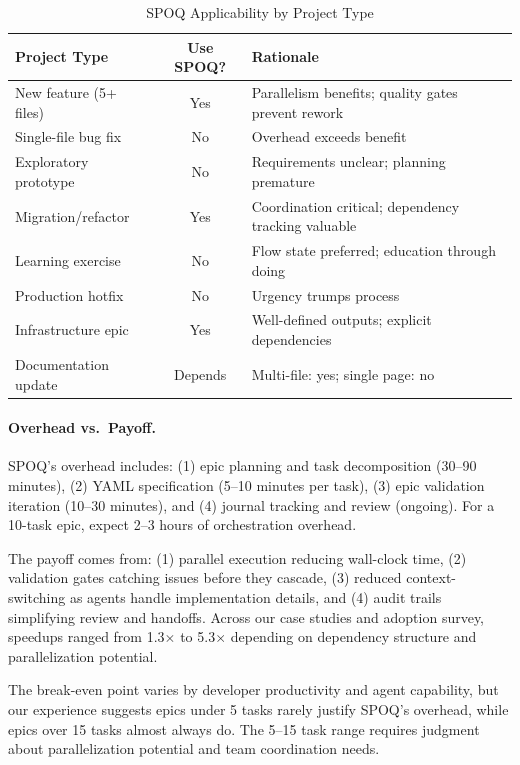 \begin{table}[htbp]
\centering
\caption{SPOQ Applicability by Project Type}
\label{tab:when-to-use}
\footnotesize
\begin{tabular}{lcp{6.5cm}}
\toprule
\textbf{Project Type} & \textbf{Use SPOQ?} & \textbf{Rationale} \\
\midrule
New feature (5+ files) & Yes & Parallelism benefits; quality gates prevent rework \\
Single-file bug fix & No & Overhead exceeds benefit \\
Exploratory prototype & No & Requirements unclear; planning premature \\
Migration/refactor & Yes & Coordination critical; dependency tracking valuable \\
Learning exercise & No & Flow state preferred; education through doing \\
Production hotfix & No & Urgency trumps process \\
Infrastructure epic & Yes & Well-defined outputs; explicit dependencies \\
Documentation update & Depends & Multi-file: yes; single page: no \\
\bottomrule
\end{tabular}
\end{table}

\paragraph{Overhead vs.\ Payoff.}
SPOQ's overhead includes: (1) epic planning and task decomposition
(30--90 minutes), (2) YAML specification (5--10 minutes per task),
(3) epic validation iteration (10--30 minutes), and (4) journal
tracking and review (ongoing). For a 10-task epic, expect 2--3 hours
of orchestration overhead.

The payoff comes from: (1) parallel execution reducing wall-clock time,
(2) validation gates catching issues before they cascade, (3) reduced
context-switching as agents handle implementation details, and
(4) audit trails simplifying review and handoffs. Across our case studies
and adoption survey, speedups ranged from 1.3$\times$ to 5.3$\times$
depending on dependency structure and parallelization potential.

The break-even point varies by developer productivity and agent
capability, but our experience suggests epics under 5 tasks rarely
justify SPOQ's overhead, while epics over 15 tasks almost always do.
The 5--15 task range requires judgment about parallelization potential
and team coordination needs.
